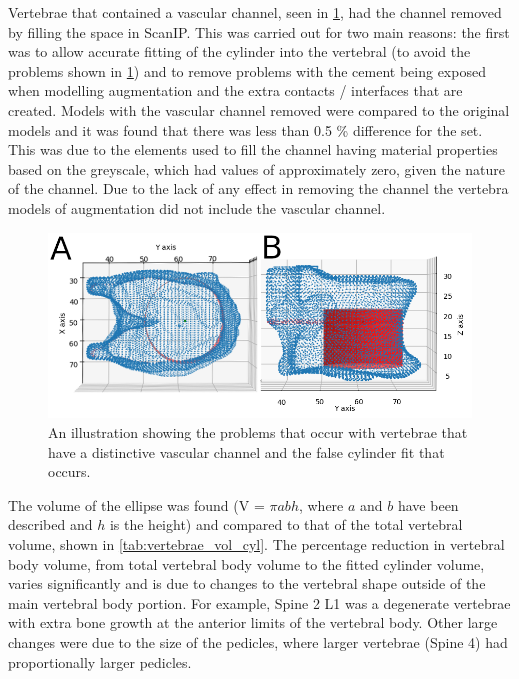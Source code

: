 Vertebrae that contained a vascular channel, seen in \cref{fig:cyl_channel},
had the channel removed by filling the space in ScanIP.
This was carried out for two main reasons: the first was to allow accurate
fitting of the cylinder into the vertebral (to avoid the problems shown in
\cref{fig:cyl_channel}) and to remove problems with the cement being exposed
when modelling augmentation and the extra contacts / interfaces that are
created.
Models with the vascular channel removed were compared to the original models
and it was found that there was less than 0.5 \% difference for the set.
This was due to the elements used to fill the channel having material
properties based on the greyscale, which had values of approximately zero,
given the nature of the channel.
Due to the lack of any effect in removing the channel the vertebra models of
augmentation did not include the vascular channel.

\begin{figure}[ht!]
  \centering
 
\includegraphics[width=5in]{Chapters/Chapter_HT_images/cyl_fit_channel_both2.png}
  \caption{An illustration showing the problems that occur with vertebrae that
have a distinctive vascular channel and the false cylinder fit that occurs.}
  \label{fig:cyl_channel}
\end{figure}


The volume of the ellipse was found (V = $\pi a b h$, where $a$ and $b$ have
been described and $h$ is the height) and compared to that of the total
vertebral volume, shown in \cref{tab:vertebrae_vol_cyl}.
The percentage reduction in vertebral body volume, from total vertebral body
volume to the fitted cylinder volume, varies significantly and is due to
changes to the vertebral shape outside of the main vertebral body portion.
For example, Spine 2 L1 was a degenerate vertebrae with extra bone growth at
the anterior limits of the vertebral body.
Other large changes were due to the size of the pedicles, where larger
vertebrae (Spine 4) had proportionally larger pedicles.

